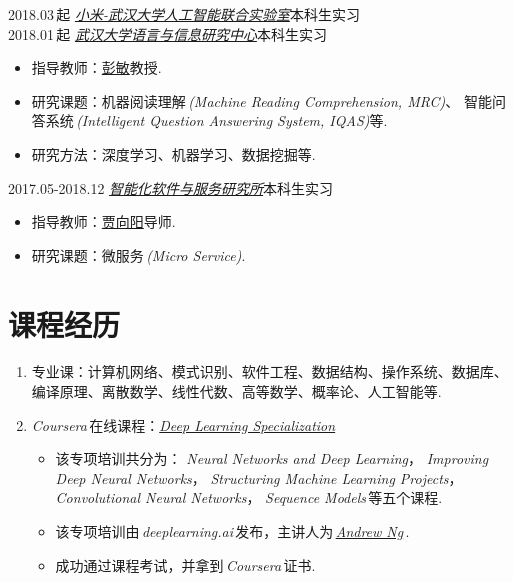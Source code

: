 \documentclass[letterpaper,AutoFakeBold]{twentysecondcv} %
\begin{document}
2018.03\,起 \qquad\qquad \href{cs.whu.edu.cn/news_show.aspx?id=871}{\emph{小米-武汉大学人工智能联合实验室}}\hfill 本科生实习
\\2018.01\,起 \qquad\qquad \href{http://sc.whu.edu.cn/}{\emph{武汉大学语言与信息研究中心}}\hfill 本科生实习
\begin{itemize}
	\item 指导教师：\href{http://li3.whu.edu.cn/article/56.html}{彭敏}教授.
	\item 研究课题：机器阅读理解\,\emph{(Machine Reading Comprehension, MRC)}、
	智能问答系统\,\emph{(Intelligent Question Answering System, IQAS)}等.
	\item 研究方法：深度学习、机器学习、数据挖掘等.
\end{itemize}
2017.05-2018.12 \qquad \href{http://csold.whu.edu.cn/plus/view.php?aid=18}{\emph{智能化软件与服务研究所}}\hfill 本科生实习
\begin{itemize}
	\item 指导教师：\href{http://cs.whu.edu.cn/teacherinfo.aspx?id=201}{贾向阳}导师.
	\item 研究课题：微服务\,\emph{(Micro Service)}.
\end{itemize}




\section{\large 课程经历}


\begin{enumerate}
	\setlength{\itemsep}{0pt}
	\setlength{\parsep}{0pt}
	\setlength{\parskip}{0pt}
	\item 专业课：计算机网络、模式识别、软件工程、数据结构、操作系统、数据库、编译原理、离散数学、线性代数、高等数学、概率论、人工智能等.
	\item \emph{Coursera\,}在线课程：\href{https://www.coursera.org/specializations/deep-learning}{\emph{Deep Learning Specialization}}
		\begin{itemize}
			\item 该专项培训共分为：
			\emph{Neural Networks and Deep Learning}，
			\emph{Improving Deep Neural Networks}，
			\emph{Structuring Machine Learning Projects}，
			\emph{Convolutional Neural Networks}，
			\emph{Sequence Models}\,等五个课程.
			\item 该专项培训由\,\emph{deeplearning.ai}\,发布，主讲人为\,\href{https://www.coursera.org/instructor/andrewng}{\emph{Andrew Ng}}\,.
			\item 成功通过课程考试，并拿到\,\emph{Coursera}\,证书.
		\end{itemize}
\end{enumerate}
\end{document}
